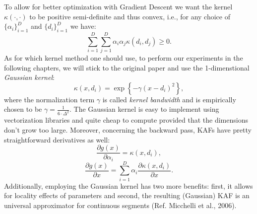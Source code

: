 \documentclass[LaM,binding=0.6cm]{./packages/sapthesis/sapthesis}
\begin{document}
    To allow for better optimization with Gradient Descent we want the kernel $\kappa(\cdot, \cdot)$ to be positive semi-definite and thus convex, i.e., for any choice of 
    $\{ \alpha_i\}_{i=1}^D $ and $\{ d_i\}_{i=1}^D $ we have:
    \begin{equation}
        \sum_{i=1}^{D} \sum_{j=1}^{D} \alpha_{i} \alpha_{j} \kappa\left(d_{i}, d_{j}\right) \geq 0 .
    \end{equation}
    As for which kernel method one should use, to perform our experiments in the following chapters, we will stick to the original paper and use the 1-dimenstional \textit{Gaussian kernel}:
    \begin{equation}
        \label{gauskaf}
        \kappa\left(x, d_{i}\right)=\exp \left\{-\gamma\left(x-d_{i}\right)^{2}\right\},
    \end{equation}
    where the normalization term $\gamma$ is called \textit{kernel bandwidth} and is empirically chosen to be $ \gamma = \frac{1}{6 \cdot \Delta^2} $.
    The Gaussian kernel is easy to implement using vectorization libraries and quite cheap to compute provided that the dimensions don't grow too large. Moreover, 
    concerning the backward pass, KAFs have pretty straightforward derivatives as well:
    \begin{equation}
        \frac{\partial g(x)}{\partial \alpha_{i}}=\kappa\left(x, d_{i}\right),
    \end{equation}
    \begin{equation}
        \frac{\partial g(x)}{\partial x}=\sum_{i=1}^{D} \alpha_{i} \frac{\partial \kappa\left(x, d_{i}\right)}{\partial x}.
    \end{equation}
    Additionally, employing the Gaussian kernel has two more benefits: first, it allows for locality effects of parameters and second, the resulting (Gaussian) KAF
    is an universal approximator for continuous segments (Ref. Micchelli et al., 2006).
\end{document}
